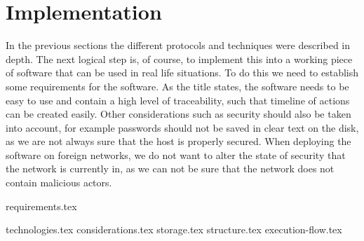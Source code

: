 \documentclass{article}
\begin{document}
\section{Implementation}
In the previous sections the different protocols and techniques were described in depth. The next logical step is, of course, to implement this into a working piece of software that can be used in real life situations. To do this we need to establish some requirements for the software. As the title states, the software needs to be easy to use and contain a high level of traceability, such that timeline of actions can be created easily. Other considerations such as security should also be taken into account, for example passwords should not be saved in clear text on the disk, as we are not always sure that the host is properly secured. When deploying the software on foreign networks, we do not want to alter the state of security that the network is currently in, as we can not be sure that the network does not contain malicious actors.

{requirements.tex}

{technologies.tex}
{considerations.tex}
{storage.tex}
{structure.tex}
{execution-flow.tex}
\end{document}
